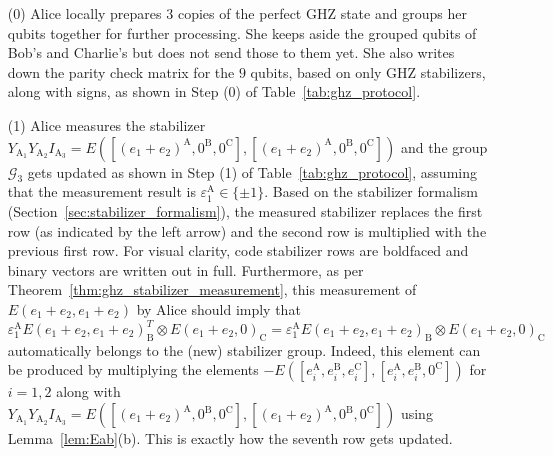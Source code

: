 \documentclass[journal,onecolumn]{IEEEtran}
\begin{document}
\begin{enumerate}

\item[(0)] Alice locally prepares $3$ copies of the perfect GHZ state and groups her qubits together for further processing. She keeps aside the grouped qubits of Bob's and Charlie's but does not send those to them yet. She also writes down the parity check matrix for the $9$ qubits, based on only GHZ stabilizers, along with signs, as shown in Step (0) of Table~\ref{tab:ghz_protocol}. \\


\item[(1)] Alice measures the stabilizer $Y_{\text{A}_1} Y_{\text{A}_2} I_{\text{A}_3} = E([(e_1+e_2)^{\text{A}},0^{\text{B}},0^{\text{C}}],[(e_1+e_2)^{\text{A}},0^{\text{B}},0^{\text{C}}])$ and the group $\mathcal{G}_3$ gets updated as shown in Step (1) of Table~\ref{tab:ghz_protocol}, assuming that the measurement result is $\varepsilon_1^{\text{A}} \in \{ \pm 1 \}$.
Based on the stabilizer formalism (Section~\ref{sec:stabilizer_formalism}), the measured stabilizer replaces the first row (as indicated by the left arrow) and the second row is multiplied with the previous first row.
For visual clarity, code stabilizer rows are boldfaced and binary vectors are written out in full.
Furthermore, as per Theorem~\ref{thm:ghz_stabilizer_measurement}, this measurement of $E(e_1+e_2, e_1+e_2)$ by Alice should imply that %
$$ \varepsilon_1^{\text{A}} E(e_1+e_2, e_1+e_2)_{\text{B}}^T \otimes E(e_1+e_2, 0)_{\text{C}} = \varepsilon_1^{\text{A}} E(e_1+e_2, e_1+e_2)_{\text{B}} \otimes E(e_1+e_2, 0)_{\text{C}} $$ 
automatically belongs to the (new) stabilizer group. %
Indeed, this element can be produced by multiplying the elements $- E([e_i^{\text{A}},e_i^{\text{B}},e_i^{\text{C}}],[e_i^{\text{A}},e_i^{\text{B}},0^{\text{C}}])$ for $i=1,2$ along with $Y_{\text{A}_1} Y_{\text{A}_2} I_{\text{A}_3} = E([(e_1+e_2)^{\text{A}},0^{\text{B}},0^{\text{C}}],[(e_1+e_2)^{\text{A}},0^{\text{B}},0^{\text{C}}])$ using Lemma~\ref{lem:Eab}(b).
This is exactly how the seventh row gets updated. \\




\end{enumerate}
\end{document}
